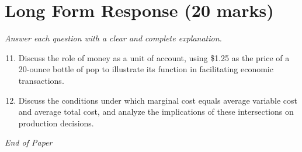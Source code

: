 \documentclass[12pt]{article}
\begin{document}
\section*{Long Form Response (20 marks)}
\textit{Answer each question with a clear and complete explanation.}
\begin{enumerate}[label=\arabic*.]
\setcounter{enumi}{10}
\item Discuss the role of money as a unit of account, using \$1.25 as the price of a 20-ounce bottle of pop to illustrate its function in facilitating economic transactions.
\item Discuss the conditions under which marginal cost equals average variable cost and average total cost, and analyze the implications of these intersections on production decisions.
\end{enumerate}

\vfill
\noindent\textit{End of Paper}
\end{document}
